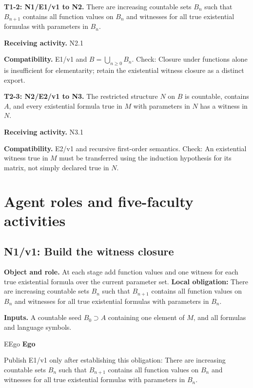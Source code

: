 \documentclass[preprint,12pt,aps,pra,showkeys,amsmath,amssymb,superscriptaddress,floatfix]{revtex4-2}
\theoremstyle{definition}
\theoremstyle{remark}
\newcommand{\mmfaculty}[3]{%
 \begin{mmfacultybox}{#1}{#2}
 {\sffamily\bfseries\color{MMBlue}#2}\par\smallskip #3
 \end{mmfacultybox}}
\newcommand{\field}[2]{\par\smallskip\noindent\textbf{#1.} #2\par}
\begin{document}
\begingroup\small\linespread{1.05}\selectfont

\field{T1-2: N1/E1/v1 to N2}{There are increasing countable sets \(B_n\) such that \(B_{n+1}\)
contains all function values on \(B_n\) and witnesses for all true
existential formulas with parameters in \(B_n\).}

\field{Receiving activity}{N2.1}

\field{Compatibility}{E1/v1 and \(B=\bigcup_{n\ge0}B_n\). Check: Closure under functions alone
is insufficient for elementarity; retain the existential witness closure
as a distinct export.}

\field{T2-3: N2/E2/v1 to N3}{The restricted structure \(N\) on \(B\) is countable, contains \(A\),
and every existential formula true in \(M\) with parameters in \(N\) has
a witness in \(N\).}

\field{Receiving activity}{N3.1}

\field{Compatibility}{E2/v1 and recursive first-order semantics. Check: An existential witness
true in \(M\) must be transferred using the induction hypothesis for its
matrix, not simply declared true in \(N\).}

\endgroup

\clearpage\section{Agent roles and five-faculty activities}\begingroup\small\linespread{1.05}\selectfont{}

\begingroup\footnotesize\linespread{1.05}\selectfont\let\small\footnotesize

\subsection{N1/v1: Build the witness closure}

\field{Object and role}{At each stage add function values and one witness for each true
existential formula over the current parameter set. \textbf{Local
obligation:} There are increasing countable sets \(B_n\) such that
\(B_{n+1}\) contains all function values on \(B_n\) and witnesses for
all true existential formulas with parameters in \(B_n\).}

\field{Inputs}{A countable seed \(B_0\supset A\) containing one element of \(M\), and
all formulas and language symbols.}

\mmfaculty{E}{Ego}{Publish E1/v1 only after establishing this obligation: There are
increasing countable sets \(B_n\) such that \(B_{n+1}\) contains all
function values on \(B_n\) and witnesses for all true existential
formulas with parameters in \(B_n\).}
\end{document}
